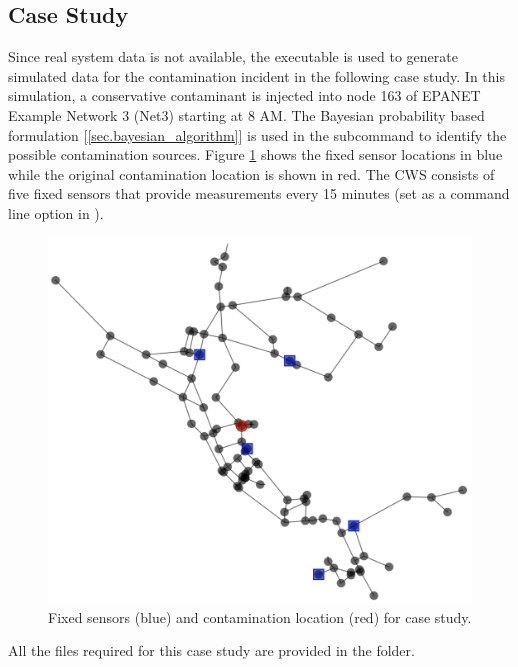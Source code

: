 \subsection{Case Study}
Since real system data is not available, the 
executable is used to generate simulated data for the contamination incident in the following case study.  In this simulation, 
a conservative contaminant is injected into node 163 of EPANET
Example Network 3 (Net3) starting at 8 AM.  The Bayesian probability
based formulation [\ref{sec.bayesian_algorithm}] is used in
the  subcommand to identify the possible contamination
sources. Figure \ref{fig:case_study_setup} shows the fixed sensor
locations in blue while the original contamination location is shown
in red.  The CWS consists of five fixed sensors that provide
measurements every 15 minutes (set as a command line option in ).

\begin{figure}[ht!]
\begin{center}
\includegraphics[scale=0.25]{graphics/inversion_cs_setup.pdf}
\caption{Fixed sensors (blue) and contamination location (red) for case study.}
\label{fig:case_study_setup}
\end{center}
\end{figure}

All the files required for this case study are provided in the  folder.
  
